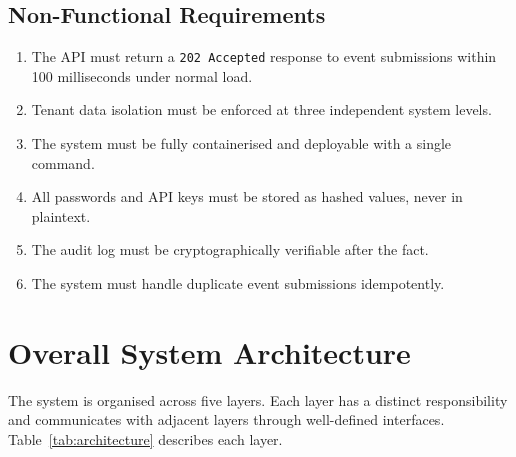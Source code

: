 \documentclass[a4paper,12pt,onecolumn]{report}
\begin{document}
\subsection{Non-Functional Requirements}

\begin{enumerate}[leftmargin=*, label=NFR-\arabic*.]
    \item The API must return a \texttt{202 Accepted} response to event submissions within 100 milliseconds under normal load.
    \item Tenant data isolation must be enforced at three independent system levels.
    \item The system must be fully containerised and deployable with a single command.
    \item All passwords and API keys must be stored as hashed values, never in plaintext.
    \item The audit log must be cryptographically verifiable after the fact.
    \item The system must handle duplicate event submissions idempotently.
\end{enumerate}

\section{Overall System Architecture}

The system is organised across five layers.
Each layer has a distinct responsibility and communicates with adjacent layers through well-defined interfaces.
Table~\ref{tab:architecture} describes each layer.
\end{document}
